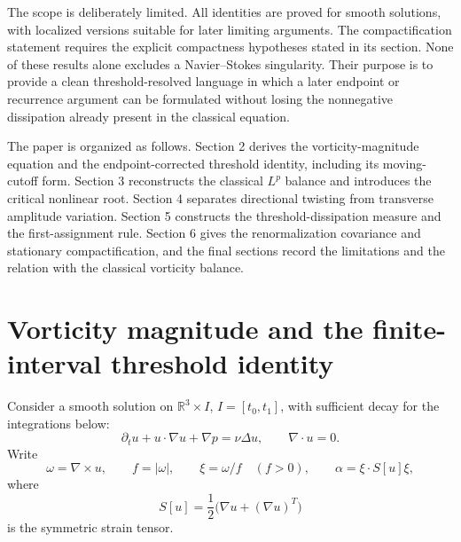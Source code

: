 \documentclass[11pt]{article}
\theoremstyle{definition}\newtheorem{definition}[theorem]{Definition}
\theoremstyle{remark}\newtheorem{remark}[theorem]{Remark}
\newcommand{\R}{\mathbb R}\newcommand{\dd}{\,d}\newcommand{\HH}{\mathcal H}
\begin{document}
The scope is deliberately limited.  All identities are proved for smooth solutions, with localized versions suitable for later limiting arguments.  The compactification statement requires the explicit compactness hypotheses stated in its section.  None of these results alone excludes a Navier--Stokes singularity.  Their purpose is to provide a clean threshold-resolved language in which a later endpoint or recurrence argument can be formulated without losing the nonnegative dissipation already present in the classical equation.

The paper is organized as follows.  Section 2 derives the vorticity-magnitude equation and the endpoint-corrected threshold identity, including its moving-cutoff form.  Section 3 reconstructs the classical $L^p$ balance and introduces the critical nonlinear root.  Section 4 separates directional twisting from transverse amplitude variation.  Section 5 constructs the threshold-dissipation measure and the first-assignment rule.  Section 6 gives the renormalization covariance and stationary compactification, and the final sections record the limitations and the relation with the classical vorticity balance.

\section{Vorticity magnitude and the finite-interval threshold identity}
Consider a smooth solution on $\R^3\times I$, $I=[t_0,t_1]$, with sufficient decay for the integrations below:
\[
\partial_tu+u\cdot\nabla u+\nabla p=\nu\Delta u,\qquad \nabla\cdot u=0.
\]
Write
\[
\omega=\nabla\times u,\qquad f=|\omega|,\qquad \xi=\omega/f\quad(f>0),\qquad \alpha=\xi\cdot S[u]\xi,
\]
where
\[
S[u]=\frac12\bigl(\nabla u+(\nabla u)^T\bigr)
\]
is the symmetric strain tensor.
\end{document}
